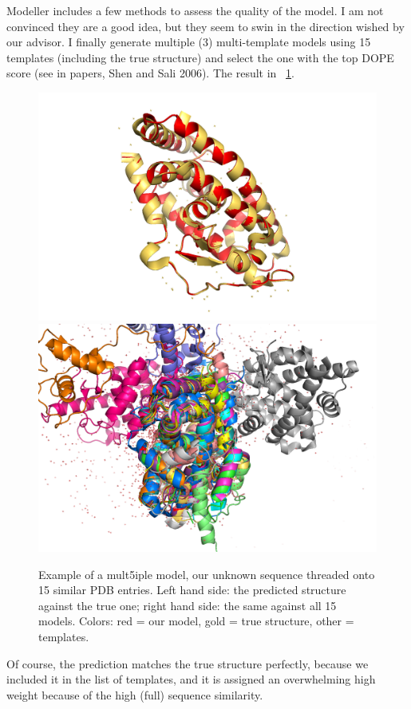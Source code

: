\documentclass[12pt,a4paper,notitlepage,onecolumn]{article}
\begin{document}
Modeller includes a few methods to assess the quality of the model. I am not convinced they are a good idea, but they seem to swin in the direction wished by our advisor. I finally generate multiple (3) multi-template models using 15 templates (including the true structure) and select the one with the top DOPE score (see in papers, Shen and Sali 2006). The result in \figurename~\ref{fig:tt_DOPE}.
\begin{figure}[h!]
 \begin{center}
  \includegraphics[width=0.45\linewidth]{prediction_truth_DOPE.png}
  \includegraphics[width=0.45\linewidth]{prediction_templates_DOPE.png}
  \caption{Example of a mult5iple model, our unknown sequence threaded onto 15 similar PDB entries. Left hand side: the predicted structure against the true one; right hand side: the same against all 15 models. Colors: red = our model, gold = true structure, other = templates.}
  \label{fig:tt_DOPE}
 \end{center}
\end{figure}
Of course, the prediction matches the true structure perfectly, because we included it in the list of templates, and it is assigned an overwhelming high weight because of the high (full) sequence similarity.
\end{document}
